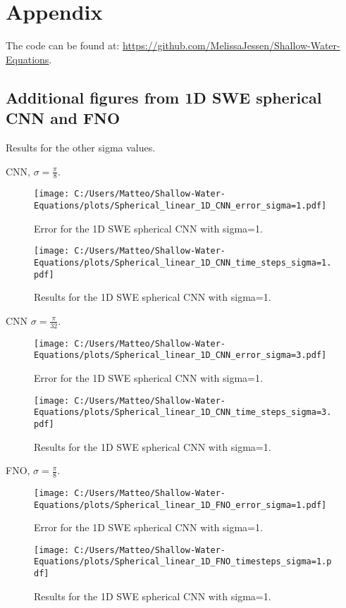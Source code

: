 \chapter{Appendix}
The code can be found at: \url{https://github.com/MelissaJessen/Shallow-Water-Equations}.


\section{Additional figures from 1D SWE spherical CNN and FNO}
Results for the other sigma values.

CNN, $\sigma = \frac{\pi}{8}$.
\begin{figure}[H]
    \centering
    \texttt{[image: C:/Users/Matteo/Shallow-Water-Equations/plots/Spherical\_linear\_1D\_CNN\_error\_sigma=1.pdf]}
    \caption{Error for the 1D SWE spherical CNN with sigma=1.}
\end{figure}

\begin{figure}[H]
    \centering
    \texttt{[image: C:/Users/Matteo/Shallow-Water-Equations/plots/Spherical\_linear\_1D\_CNN\_time\_steps\_sigma=1.pdf]}
    \caption{Results for the 1D SWE spherical CNN with sigma=1.}
\end{figure}

CNN $\sigma = \frac{\pi}{32}$.
\begin{figure}[H]
    \centering
    \texttt{[image: C:/Users/Matteo/Shallow-Water-Equations/plots/Spherical\_linear\_1D\_CNN\_error\_sigma=3.pdf]}
    \caption{Error for the 1D SWE spherical CNN with sigma=1.}
\end{figure}

\begin{figure}[H]
    \centering
    \texttt{[image: C:/Users/Matteo/Shallow-Water-Equations/plots/Spherical\_linear\_1D\_CNN\_time\_steps\_sigma=3.pdf]}
    \caption{Results for the 1D SWE spherical CNN with sigma=1.}
\end{figure}

FNO, $\sigma = \frac{\pi}{8}$.
\begin{figure}[H]
    \centering
    \texttt{[image: C:/Users/Matteo/Shallow-Water-Equations/plots/Spherical\_linear\_1D\_FNO\_error\_sigma=1.pdf]}
    \caption{Error for the 1D SWE spherical CNN with sigma=1.}
\end{figure}

\begin{figure}[H]
    \centering
    \texttt{[image: C:/Users/Matteo/Shallow-Water-Equations/plots/Spherical\_linear\_1D\_FNO\_timesteps\_sigma=1.pdf]}
    \caption{Results for the 1D SWE spherical CNN with sigma=1.}
\end{figure}

